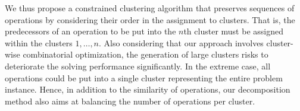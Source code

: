 \documentclass[runningheads]{llncs}
\begin{document}
We thus propose a constrained clustering algorithm that preserves sequences of operations by considering their order in the assignment to clusters. That is, the predecessors of an operation to be put into the $n$th cluster must be assigned within the clusters $1,\dots,n$. 
Also considering that our approach involves cluster-wise combinatorial optimization, the generation of large clusters risks to deteriorate the solving performance significantly.
In the extreme case, all operations could be put into a single cluster representing the entire problem instance.
Hence, in addition to the similarity of operations, our decomposition method also aims at balancing the number of operations per cluster.  
\end{document}
